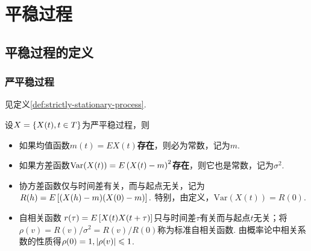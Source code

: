 \section{平稳过程}


\subsection{平稳过程的定义}

\begin{frame}
    \frametitle{严平稳过程}
    \begin{mydefinition}[严平稳过程]
        见定义\ref{def:strictly-stationary-process}.
    \end{mydefinition}
    \begin{myproposition}[严平稳过程的数字特征]
        设$X=\left\{X(t),t\in T\right\}$为严平稳过程，则
        \begin{itemize}
            \item 如果均值函数$m(t)=EX(t)$\textbf{存在}，则必为常数，记为$m$.
            \item 如果方差函数$\mathrm{Var}(X(t))=E\left(X(t)-m\right)^2$\textbf{存在}，则它也是常数，记为$\sigma^2$. 
            \item 协方差函数仅与时间差有关，而与起点无关，记为
            $
                R(h)=E\left[(X(h)-m)(X(0)-m)\right].
            $
            特别，由定义，$\mathrm{Var}(X(t))=R(0)$. 
            \item 自相关函数 $r(\tau)=E\left[X(t)X(t+\tau)\right]$只与时间差$\tau$有关而与起点$t$无关；将
            $\rho(v)=R(v)/\sigma^2=R(v)/R(0)$称为标准自相关函数. 由概率论中相关系数的性质\footnotemark 得$\rho(0)=1,\left\lvert\rho(v)\right\rvert\leqslant1$.
        \end{itemize}
    \end{myproposition}
\end{frame}

\setcounter{footnote}{0}

